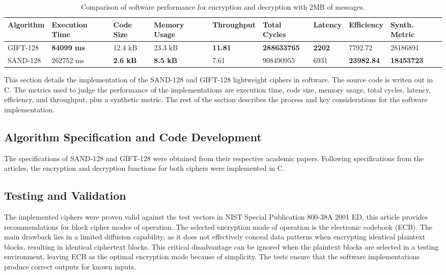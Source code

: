 \documentclass[conference]{IEEEtran}
\begin{document}
\begin{table}[ht]
  \centering
  \caption{Comparison of software performance for encryption and decryption with 2MB of messages.}
  \begin{tabular}{lllllllll} 
   \toprule
   Algorithm & Execution Time & Code Size & Memory Usage & Throughput & Total Cycles & Latency & Efficiency & Synth. Metric\\ 
   \midrule
   GIFT-128 & \textbf{84099 ms} & 12.4 kB & 23.3 kB & \textbf{11.81} & \textbf{288633765} & \textbf{2202} & 7792.72 & 28186891 \\
   SAND-128 & 262752 ms & \textbf{2.6 kB} & \textbf{8.5 kB} & 7.61 & 908490955 & 6931 & \textbf{23982.84} & \textbf{18453723}  \\
   \bottomrule
  \end{tabular}
  \label{table:dec}
\end{table}

This section details the implementation of the SAND-128 and GIFT-128 lightweight ciphers in software. The source code is writen out in C. The metrics used to judge the performance of the implementations are execution time, code size, memory usage, total cycles, latency, efficiency, and throughput, plus a synthetic metric. The rest of the section describes the process and key considerations for the software implementation.

\subsection{Algorithm Specification and Code Development}

The specifications of SAND-128 and GIFT-128 were obtained from their respective academic papers. Following specifications from the articles, the encryption and decryption functions for both ciphers were implemented in C.

\subsection{Testing and Validation}

The implemented ciphers were proven valid against the test vectors in NIST Special Publication 800-38A 2001 ED\cite{dworkin2001recommendation}, this article provides recommendations for block cipher modes of operation. The selected encryption mode of operation is the electronic codebook (ECB). The main drawback lies in a limited diffusion capability, as it does not effectively conceal data patterns when encrypting identical plaintext blocks, resulting in identical ciphertext blocks. This critical disadvantage can be ignored when the plaintext blocks are selected in a testing environment, leaving ECB as the optimal encryption mode because of simplicity. The tests ensure that the software implementations produce correct outputs for known inputs.
\end{document}
